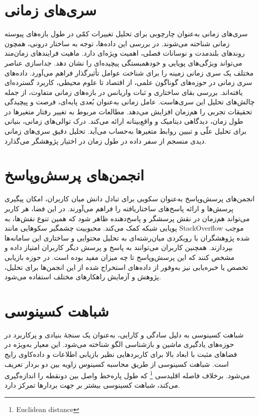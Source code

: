\section{سری‌های زمانی}
سری‌های زمانی به‌عنوان چارچوبی برای تحلیل تغییرات کمّی در طول بازه‌های پیوسته زمانی شناخته می‌شوند. در بررسی این داده‌ها، توجه به ساختار درونی، همچون روندهای بلندمدت و نوسانات فصلی، اهمیت ویژه‌ای دارد. ماهیت فرایندهای زمان‌مند می‌تواند ویژگی‌های پویایی و خودهمبستگی پیچیده‌ای را نشان دهد. جداسازی عناصر مختلف یک سری زمانی زمینه را برای شناخت عوامل تأثیرگذار فراهم می‌آورد. داده‌های سری زمانی در حوزه‌های گوناگون علمی، از اقتصاد تا علوم محیطی، کاربرد گسترده‌ای یافته‌اند. بررسی بقای ساختاری و ثبات واریانس در بازه‌های زمانی متفاوت، از جمله چالش‌های تحلیل این سری‌هاست. عامل زمانی به‌عنوان بُعدی پایه‌ای، فرصت و پیچیدگی تحقیقات تجربی را هم‌زمان افزایش می‌دهد. مطالعات مربوط به تغییر رفتار متغیرها در طول زمان، دیدگاهی دینامیک و واقع‌بینانه ارائه می‌کند. درک توالی‌های زمانی، بنیانی برای تحلیل علّی و تبیین روابط متغیرها به‌حساب می‌آید. تحلیل دقیق سری‌های زمانی دیدی منسجم از سفر داده در طول زمان در اختیار پژوهشگر می‌گذارد. \cite{kirchgassner_introduction_2012}

\section{انجمن‌های پرسش‌وپاسخ}
انجمن‌های پرسش‌وپاسخ به‌عنوان سکویی برای تبادل دانش میان کاربران، امکان پیگیری پرسش‌ها و ارائه پاسخ‌های ساختاریافته را فراهم می‌آورند. در این فضا، هر کاربر می‌تواند هم‌زمان در نقش پرسشگر و پاسخ‌دهنده ظاهر شود که همین تنوع نقش‌ها، به پویایی شبکه کمک می‌کند. محبوبیت چشمگیر سکو‌هایی مانند StackOverflow موجب شده پژوهشگران با رویکردی میان‌رشته‌ای به تحلیل محتوایی و ساختاری این سامانه‌ها بپردازند. همچنین کاربران می‌توانند به پاسخ و پرسش دیگر کاربران امتیاز داده و مشخص کنند که این پرسش‌وپاسخ تا چه میزان مفید بوده است.
 در حوزه بازیابی تخصص یا خبره‌یابی نیز به‌وفور از داده‌های استخراج شده از این انجمن‌ها برای تحلیل، پژوهش و آزمایش راهکارهای مختلف استفاده می‌شود.\cite{neshati_early_2017} 


 \section{شباهت کسینوسی}
 شباهت کسینوسی  به دلیل سادگی و کارایی، به‌عنوان یک سنجهٔ بنیادی و پرکاربرد در حوزه‌های یادگیری ماشین و بازشناسی الگو شناخته می‌شود. این معیار به‌ویژه در فضاهای مثبت با ابعاد بالا برای کاربردهایی نظیر بازیابی اطلاعات و داده‌کاوی رایج است. شباهت کسینوسی از طریق محاسبه کسینوس زاویه بین دو بردار تعریف می‌شود. برخلاف فاصله اقلیدسی \footnote{Euclidean distance} که طول پاره‌خط واصل بین دونقطه را اندازه‌گیری می‌کند، شباهت کسینوسی بیشتر بر جهت بردارها تمرکز دارد.

